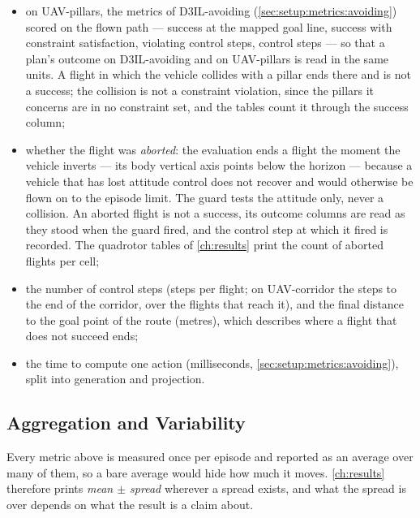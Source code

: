 \begin{itemize}
    violating steps against the time to compute one action, among the configurations that reach the finish
    line on every flight; within groups of configurations that violate about equally it is drawn as on
    D3IL-avoiding, on control steps to the finish line against time;
  \item on UAV-pillars, the metrics of D3IL-avoiding (\autoref{sec:setup:metrics:avoiding}) scored on the
    flown path --- success at the mapped goal line, success with constraint satisfaction, violating
    control steps, control steps --- so that a plan's outcome on D3IL-avoiding and on UAV-pillars is read
    in the same units. A flight in which the vehicle collides with a pillar ends there and is not a
    success; the collision is not a constraint violation, since the pillars it concerns are in no
    constraint set, and the tables count it through the success column;
  \item whether the flight was \emph{aborted}: the evaluation ends a flight the moment the vehicle
    inverts --- its body vertical axis points below the horizon --- because a vehicle that has lost
    attitude control does not recover and would otherwise be flown on to the episode limit. The guard
    tests the attitude only, never a collision. An aborted flight is not a success, its outcome columns
    are read as they stood when the guard fired, and the control step at which it fired is recorded.
    The quadrotor tables of \autoref{ch:results} print the count of aborted flights per cell;
  \item the number of control steps (steps per flight; on UAV-corridor the steps to the end of the corridor, over the
    flights that reach it), and the final distance to the goal point of the
    route (metres), which describes where a flight that does not succeed ends;
  \item the time to compute one action (milliseconds, \autoref{sec:setup:metrics:avoiding}), split into
    generation and projection.
\end{itemize}

\subsection{Aggregation and Variability}\label{sec:setup:metrics:spread}

Every metric above is measured once per episode and reported as an average over many of them, so a bare
average would hide how much it moves. \autoref{ch:results} therefore prints \emph{mean $\pm$ spread}
wherever a spread exists, and what the spread is over depends on what the result is a claim about.

